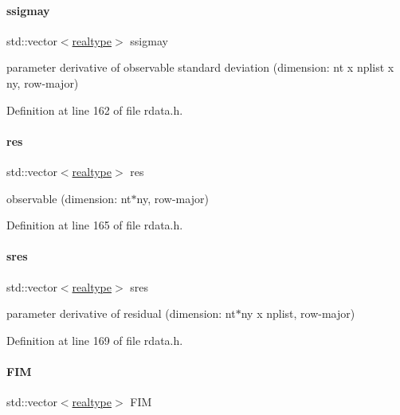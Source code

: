 \paragraph{\texorpdfstring{ssigmay}{ssigmay}}
{\footnotesize\ttfamily std\+::vector$<$\mbox{\hyperlink{namespaceamici_a1bdce28051d6a53868f7ccbf5f2c14a3}{realtype}}$>$ ssigmay}

parameter derivative of observable standard deviation (dimension\+: nt x nplist x ny, row-\/major) 

Definition at line 162 of file rdata.\+h.

\mbox{\label{classamici_1_1_return_data_ac3a3eb1d5c3af27a82a144086eafc832}} 
\paragraph{\texorpdfstring{res}{res}}
{\footnotesize\ttfamily std\+::vector$<$\mbox{\hyperlink{namespaceamici_a1bdce28051d6a53868f7ccbf5f2c14a3}{realtype}}$>$ res}

observable (dimension\+: nt$\ast$ny, row-\/major) 

Definition at line 165 of file rdata.\+h.

\mbox{\label{classamici_1_1_return_data_a799ab0ed6276a81d6c3afd20654f8193}} 
\paragraph{\texorpdfstring{sres}{sres}}
{\footnotesize\ttfamily std\+::vector$<$\mbox{\hyperlink{namespaceamici_a1bdce28051d6a53868f7ccbf5f2c14a3}{realtype}}$>$ sres}

parameter derivative of residual (dimension\+: nt$\ast$ny x nplist, row-\/major) 

Definition at line 169 of file rdata.\+h.

\mbox{\label{classamici_1_1_return_data_ac7b78ca07fbf54e5dd558d5fdf520cf0}} 
\paragraph{\texorpdfstring{FIM}{FIM}}
{\footnotesize\ttfamily std\+::vector$<$\mbox{\hyperlink{namespaceamici_a1bdce28051d6a53868f7ccbf5f2c14a3}{realtype}}$>$ F\+IM}

